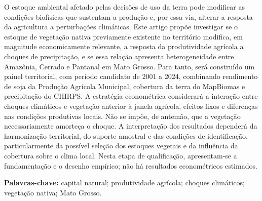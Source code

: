 O estoque ambiental afetado pelas decisões de uso da terra pode modificar as condições biofísicas que sustentam a produção e, por essa via, alterar a resposta da agricultura a perturbações climáticas. Este artigo propõe investigar se o estoque de vegetação nativa previamente existente no território modifica, em magnitude economicamente relevante, a resposta da produtividade agrícola a choques de precipitação, e se essa relação apresenta heterogeneidade entre Amazônia, Cerrado e Pantanal em Mato Grosso. Para tanto, será construído um painel territorial, com período candidato de 2001 a 2024, combinando rendimento de soja da Produção Agrícola Municipal, cobertura da terra do MapBiomas e precipitação do CHIRPS. A estratégia econométrica considerará a interação entre choques climáticos e vegetação anterior à janela agrícola, efeitos fixos e diferenças nas condições produtivas locais. Não se impõe, de antemão, que a vegetação necessariamente amorteça o choque. A interpretação dos resultados dependerá da harmonização territorial, do suporte amostral e das condições de identificação, particularmente da possível seleção dos estoques vegetais e da influência da cobertura sobre o clima local. Nesta etapa de qualificação, apresentam-se a fundamentação e o desenho empírico; não há resultados econométricos estimados.

\medskip
\noindent\textbf{Palavras-chave:} capital natural; produtividade agrícola; choques climáticos; vegetação nativa; Mato Grosso.
